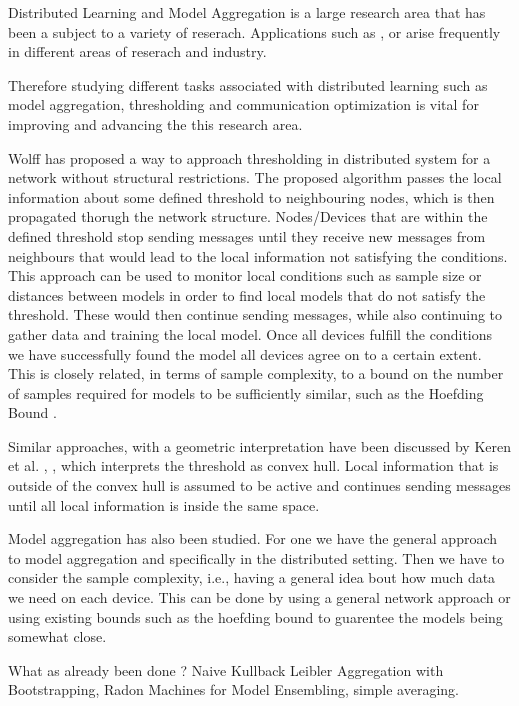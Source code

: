 Distributed Learning and Model Aggregation is a large research area that has been a subject to a variety of reserach.
Applications such as ,  or  arise frequently in different areas of reserach and industry. 

Therefore studying different tasks associated with distributed learning such as model aggregation, thresholding and communication optimization is vital for improving and advancing the this research area.

Wolff \cite{wolff2013local} has proposed a way to approach thresholding in distributed system for a network without structural restrictions.
The proposed algorithm passes the local information about some defined threshold to neighbouring nodes, which is then propagated thorugh the network structure. Nodes/Devices that are within the defined threshold stop sending messages until they receive new messages from neighbours that would lead to the local information not satisfying the conditions.
This approach can be used to monitor local conditions such as sample size or distances between models in order to find local models that do not satisfy the threshold. These would then continue sending messages, while also continuing to gather data and training the local model. 
Once all devices fulfill the conditions we have successfully found the model all devices agree on to a certain extent. 
This is closely related, in terms of sample complexity, to a bound on the number of samples required for models to be sufficiently similar, such as the Hoefding Bound .

Similar approaches, with a geometric interpretation have been discussed by Keren et al. \cite{sharfman2007geometric}, \cite{keren2011shape}, which interprets the threshold as convex hull. Local information that is outside of the convex hull is assumed to be active and continues sending messages until all local information is inside the same space.

Model aggregation has also been studied.
For one we have the general approach to model aggregation and specifically in the distributed setting.
Then we have to consider the sample complexity, i.e., having a general idea bout how much data we need on each device.
This can be done by using a general network approach or using existing bounds such as the hoefding bound to guarentee the models being somewhat close.

What as already been done ?
Naive Kullback Leibler Aggregation with Bootstrapping, Radon Machines for Model Ensembling, simple averaging.

